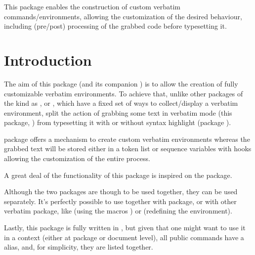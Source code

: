 \documentclass[10pt]{article}
\begin{document}
  

\begin{typesetabstract}
 
This package enables the construction of custom verbatim commands/environments, allowing the customization of the desired behaviour, including (pre/post) processing of the grabbed code before typesetting it.
\end{typesetabstract}

\tableofcontents

\section{Introduction}

The aim of this package (and its companion ) is to allow the creation of fully customizable verbatim environments. To achieve that, unlike other packages of the kind as ,  or , which have a fixed set of ways to collect/display a verbatim environment,   split the action of grabbing some text in verbatim mode (this package, ) from typesetting it with or without syntax highlight (package ).

 package offers a mechanism to create custom verbatim environments whereas the grabbed text will be stored either in a  token list or sequence variables with hooks allowing the customization of the entire process.
\begin{tsremark}
  A great deal of the functionality of this package is inspired on the  package.
\end{tsremark}

\begin{tsremark}
  Although the two packages are though to be used together, they can be used separately. It's perfectly possible to use  together with  package, or   with other verbatim package, like  (using the macros \tsobj{\SaveVerb,\UseVerb}) or  (redefining the  environment).
\end{tsremark}
Lastly, this package is fully written in , but given that one might want to use it in a \LaTeXe{} context (either at package or document level), all public commands have a \LaTeXe{} alias, and, for simplicity, they are listed together.
\end{document}
